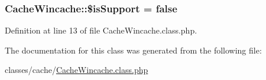 \subsubsection[{\texorpdfstring{\$is\+Support}{$isSupport}}]{\setlength{\rightskip}{0pt plus 5cm}Cache\+Wincache\+::\$is\+Support = false\hspace{0.3cm}{\ttfamily [static]}}\hypertarget{classCacheWincache_a633cb53cf9535236075169604bf363e3}{}\label{classCacheWincache_a633cb53cf9535236075169604bf363e3}


Definition at line 13 of file Cache\+Wincache.\+class.\+php.



The documentation for this class was generated from the following file\+:\begin{DoxyCompactItemize}
\item 
classes/cache/\hyperlink{CacheWincache_8class_8php}{Cache\+Wincache.\+class.\+php}\end{DoxyCompactItemize}
